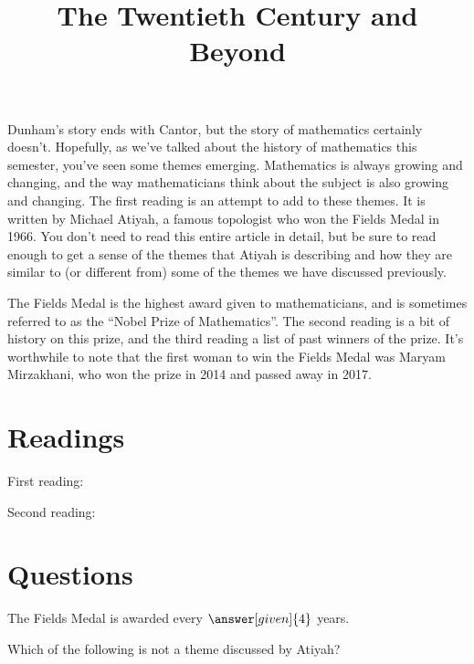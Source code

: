 \documentclass[nooutcomes]{ximera}
\title{The Twentieth Century and Beyond}
\begin{document}
\begin{abstract}
    
\end{abstract}
\maketitle

Dunham's story ends with Cantor, but the story of mathematics certainly doesn't.  Hopefully, as we've talked about the history of mathematics this semester, you've seen some themes emerging.  Mathematics is always growing and changing, and the way mathematicians think about the subject is also growing and changing.  The first reading is an attempt to add to these themes.  It is written by Michael Atiyah, a famous topologist who won the Fields Medal in 1966.  You don't need to read this entire article in detail, but be sure to read enough to get a sense of the themes that Atiyah is describing and how they are similar to (or different from) some of the themes we have discussed previously.

The Fields Medal is the highest award given to mathematicians, and is sometimes referred to as the ``Nobel Prize of Mathematics''.  The second reading is a bit of history on this prize, and the third reading a list of past winners of the prize.  It's worthwhile to note that the first woman to win the Fields Medal was Maryam Mirzakhani, who won the prize in 2014 and passed away in 2017.



\section{Readings}
First reading: 

Second reading: 





\section{Questions}

\begin{question}
The Fields Medal is awarded every $\answer[given]{4}$ years.
\end{question}

\begin{question}
Which of the following is not a theme discussed by Atiyah?
\begin{multipleChoice}
\end{multipleChoice}
\end{question}


%
\end{document}
